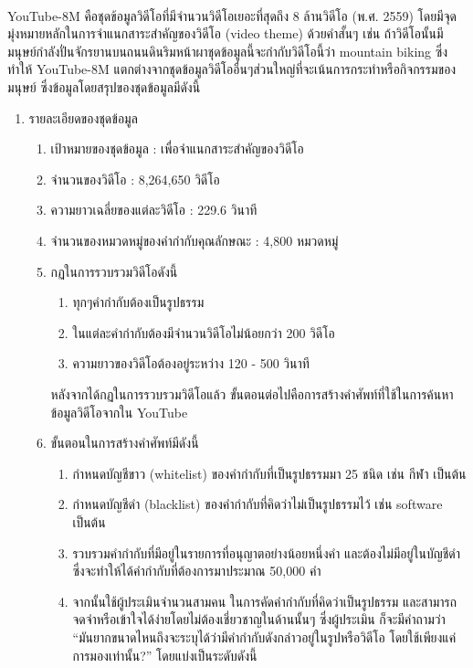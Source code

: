 YouTube-8M\textsuperscript{\cite{abu2016youtube}} คือชุดข้อมูลวิดีโอที่มีจำนวนวิดีโอเยอะที่สุดถึง 8 ล้านวิดีโอ (พ.ศ. 2559) โดยมีจุดมุ่งหมายหลักในการจำแนกสาระสำคัญของวิดีโอ (video theme) 
ด้วยคำสั้นๆ เช่น ถ้าวิดีโอนั้นมีมนุษย์กำลังปั่นจักรยานบนถนนดินริมหน้าผาชุดข้อมูลนี้จะกำกับวิดีโอนี้ว่า mountain biking ซึ่งทำให้ YouTube-8M 
แตกต่างจากชุดข้อมูลวิดีโออื่นๆส่วนใหญ่ที่จะเน้นการกระทำหรือกิจกรรมของมนุษย์ ซึ่งข้อมูลโดยสรุปของชุดข้อมูลมีดังนี้
\begin{enumerate}
	\item {รายละเอียดของชุดข้อมูล}
	\begin{enumerate}
		\setlength\itemsep{-0.25em}
		\item เป้าหมายของชุดข้อมูล : เพื่อจำแนกสาระสำคัญของวิดีโอ
		\item จำนวนของวิดีโอ : 8,264,650 วิดีโอ
		\item ความยาวเฉลี่ยของแต่ละวิดีโอ : 229.6 วินาที
		\item จำนวนของหมวดหมู่ของคำกำกับคุณลักษณะ : 4,800 หมวดหมู่
		\item กฏในการรวบรวมวิดีโอดังนี้
		\begin{enumerate}
			\setlength\itemsep{-0.25em}
			\item ทุกๆคำกำกับต้องเป็นรูปธรรม
			\item ในแต่ละคำกำกับต้องมีจำนวนวิดีโอไม่น้อยกว่า 200 วิดีโอ
			\item ความยาวของวิดีโอต้องอยู่ระหว่าง 120 - 500 วินาที
		\end{enumerate}
		หลังจากได้กฏในการรวบรวมวิดีโอแล้ว ขั้นตอนต่อไปคือการสร้างคำศัพท์ที่ใช้ในการค้นหาข้อมูลวิดีโอจากใน YouTube 
		\item ขั้นตอนในการสร้างคำศัพท์มีดังนี้
		\begin{enumerate}
			\setlength\itemsep{-0.25em}
			\item กำหนดบัญชีขาว (whitelist) ของคำกำกับที่เป็นรูปธรรมมา 25 ชนิด เช่น กีฬา เป็นต้น
			\item กำหนดบัญชีดำ (blacklist) ของคำกำกับที่คิดว่าไม่เป็นรูปธรรมไว้ เช่น software เป็นต้น
			\item รวบรวมคำกำกับที่มีอยู่ในรายการที่อนุญาตอย่างน้อยหนึ่งคำ และต้องไม่มีอยู่ในบัญชีดำ ซึ่งจะทำให้ได้คำกำกับที่ต้องการมาประมาณ 50,000 คำ
			\item จากนั้นใช้ผู้ประเมินจำนวนสามคน ในการคัดคำกำกับที่คิดว่าเป็นรูปธรรม และสามารถจดจำหรือเข้าใจได้ง่ายโดยไม่ต้องเชี่ยวชาญในด้านนั้นๆ 
			ซึ่งผู้ประเมิน ก็จะมีคำถามว่า “มันยากขนาดไหนถึงจะระบุได้ว่ามีคำกำกับดังกล่าวอยู่ในรูปหรือวิดีโอ โดยใช้เพียงแค่การมองเท่านั้น?” โดยแบ่งเป็นระดับดังนี้
			\begin{enumerate}

\end{enumerate}
\end{enumerate}
\end{enumerate}
\end{enumerate}
